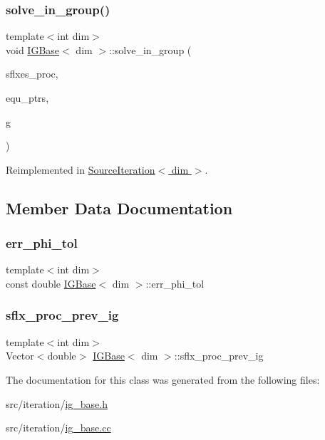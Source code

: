 \subsubsection{\texorpdfstring{solve\+\_\+in\+\_\+group()}{solve\_in\_group()}}
{\footnotesize\ttfamily template$<$int dim$>$ \\
void \hyperlink{class_i_g_base}{I\+G\+Base}$<$ dim $>$\+::solve\+\_\+in\+\_\+group (\begin{DoxyParamCaption}\item[{std\+::vector$<$ Vector$<$ double $>$ $>$ \&}]{sflxes\+\_\+proc,  }\item[{std\+\_\+cxx11\+::shared\+\_\+ptr$<$ \hyperlink{class_equation_base}{Equation\+Base}$<$ dim $>$ $>$}]{equ\+\_\+ptrs,  }\item[{unsigned int \&}]{g }\end{DoxyParamCaption})\hspace{0.3cm}{\ttfamily [virtual]}}



Reimplemented in \hyperlink{class_source_iteration_a6d726b9a581391cc4164c29f4ccd1ca5}{Source\+Iteration$<$ dim $>$}.



\subsection{Member Data Documentation}
\mbox{\label{class_i_g_base_ace9461aa2cfc9dcc4455616d2d9d6049}} 
\subsubsection{\texorpdfstring{err\+\_\+phi\+\_\+tol}{err\_phi\_tol}}
{\footnotesize\ttfamily template$<$int dim$>$ \\
const double \hyperlink{class_i_g_base}{I\+G\+Base}$<$ dim $>$\+::err\+\_\+phi\+\_\+tol\hspace{0.3cm}{\ttfamily [protected]}}

\mbox{\label{class_i_g_base_a0a301d6077cb7c94ab0942ab3d5082a5}} 
\subsubsection{\texorpdfstring{sflx\+\_\+proc\+\_\+prev\+\_\+ig}{sflx\_proc\_prev\_ig}}
{\footnotesize\ttfamily template$<$int dim$>$ \\
Vector$<$double$>$ \hyperlink{class_i_g_base}{I\+G\+Base}$<$ dim $>$\+::sflx\+\_\+proc\+\_\+prev\+\_\+ig\hspace{0.3cm}{\ttfamily [protected]}}



The documentation for this class was generated from the following files\+:\begin{DoxyCompactItemize}
\item 
src/iteration/\hyperlink{ig__base_8h}{ig\+\_\+base.\+h}\item 
src/iteration/\hyperlink{ig__base_8cc}{ig\+\_\+base.\+cc}\end{DoxyCompactItemize}
